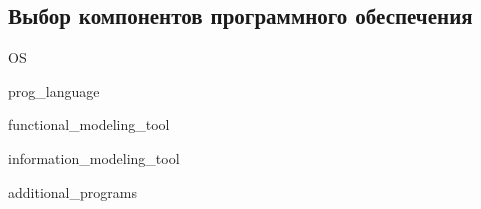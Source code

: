 \subsection{Выбор компонентов программного обеспечения}

{OS}

{prog_language}

{functional_modeling_tool}

{information_modeling_tool}

{additional_programs}
